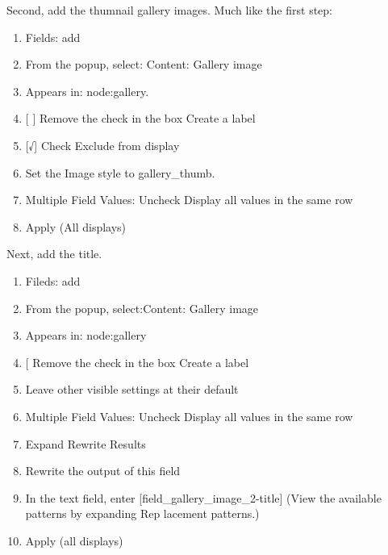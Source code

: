 \documentclass[letterpaper,10pt,english]{sphinxmanual}
\begin{document}
Second, add the thumnail gallery images. Much like the first step:
\begin{enumerate}
\item {} 
Fields: add

\item {} 
From the popup, select: Content: Gallery image

\item {} 
Appears in: node:gallery.

\item {} 
{[}  {]} Remove the check in the box Create a label

\item {} 
{[}√{]} Check Exclude from display

\item {} 
Set the Image style to gallery\_thumb.

\item {} 
Multiple Field Values: Uncheck Display all values in the same row

\item {} 
Apply (All displays)

\end{enumerate}

Next, add the title.
\begin{enumerate}
\item {} 
Fileds: add

\item {} 
From the popup, select:Content: Gallery image

\item {} 
Appears in: node:gallery

\item {} 
{[}   Remove the check in the box Create a label

\item {} 
Leave other visible settings at their default

\item {} 
Multiple Field Values: Uncheck Display all values in the same row

\item {} 
Expand Rewrite Results

\item {} 
Rewrite the output of this field

\item {} 
In the text field, enter {[}field\_gallery\_image\_2-title{]} (View the available patterns by expanding Rep lacement patterns.)

\item {} 
Apply (all displays)

\end{enumerate}
\end{document}

